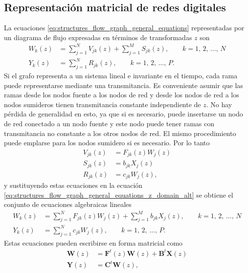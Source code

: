 \documentclass[a4paper]{report}
\newcommand{\C}{\mathbf{C}} %
\newcommand{\B}{\mathbf{B}}
\newcommand{\F}{\mathbf{F}}
\newcommand{\W}{\mathbf{W}}
\newcommand{\X}{\mathbf{X}}
\newcommand{\Y}{\mathbf{Y}}
\begin{document}
\subsection{Representación matricial de redes digitales}

La ecuaciones \ref{eq:structures_flow_graph_general_equations} representadas por un diagrama de flujo expresadas en términos de transformadas \(z\) son
\begin{equation}\label{eq:structures_flow_graph_general_equations_z_domain_alt}
 \begin{aligned}
   W_k(z)&=\sum_{j=1}^N V_{jk}(z)+\sum_{j=1}^M S_{jk}(z),\qquad k=1,\,2,\,\dots,\,N\\
   Y_k(z)&=\sum_{j=1}^N R_{jk}(z),\qquad k=1,\,2,\,\dots,\,P.
 \end{aligned}
\end{equation}
Si el grafo representa a un sistema lineal e invariante en el tiempo, cada rama puede representarse mediante una transmitancia. Es conveniente asumir que las ramas desde los nodos fuente a los nodos de red y desde los nodos de red a los nodos sumideros tienen transmitancia constante independiente de \(z\). No hay pérdida de generalidad en esto, ya que si es necesario, puede insertarse un nodo de red conectado a un nodo fuente y este nodo puede tener ramas con transmitancia no constante a los otros nodos de red. El mismo procedimiento puede emplarse para los nodos sumidero si es necesario. Por lo tanto
\begin{equation*}
 \begin{aligned}
   V_{jk}(z)&=F_{jk}(z)W_j(z)\\
   S_{jk}(z)&=b_{jk}X_j(z)\\
   R_{jk}(z)&=c_{jk}W_j(z),
 \end{aligned}
\end{equation*}
y sustituyendo estas ecuaciones en la ecuación \ref{eq:structures_flow_graph_general_equations_z_domain_alt} se obtiene el conjunto de ecuaciones algebraicas lineales
\begin{equation}\label{eq:structures_flow_graph_general_equations_z_domain}
 \begin{aligned}
   W_k(z)&=\sum_{j=1}^N F_{jk}(z)W_j(z)+\sum_{j=1}^M b_{jk}X_j(z),\qquad k=1,\,2,\,\dots,\,N\\
   Y_k(z)&=\sum_{j=1}^N c_{jk}W_j(z),\qquad k=1,\,2,\,\dots,\,P.
 \end{aligned}
\end{equation}
Estas ecuaciones pueden escribirse en forma matricial como
\begin{equation}\label{eq:structures_flow_graph_general_equations_z_domain_matrix}
 \begin{aligned}
   \W(z)&=\F^t(z)\W(z)+\B^t\X(z)\\
   \Y(z)&=\C^t\W(z),
 \end{aligned}
\end{equation}
\end{document}
